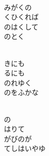 \documentclass[10pt,b5j]{tarticle} %
\begin{document}
\vspace{1.5em} %
\newcommand{\linespace}{0.5em} %
\newcommand{\blocksize}{0.5\hsize} %
\newcommand{\itemmargin}{3em} %
\begin{enumerate} %
    \setlength{\itemindent}{\itemmargin} %
    \begin{minipage}[c]{\blocksize}
    
        \vspace{\linespace}
        \item~\\
        みがくの\\
        くひくれば\\
        のはくして\\
        のとく
        
    \end{minipage}
    \begin{minipage}[c]{\blocksize}
        
        \vspace{\linespace}
        \item~\\
        きにも\\
        るにも\\
        のれゆく\\
        のをふかな
        
    \end{minipage}
    \begin{minipage}[c]{\blocksize}
        
        \vspace{\linespace}
        \item~\\
        の\\
        はりて\\
        がびのが\\
        てしはいやゆ
        
    \end{minipage}
    \begin{minipage}[c]{\blocksize}
        

\end{minipage}
\end{enumerate}
\end{document}
